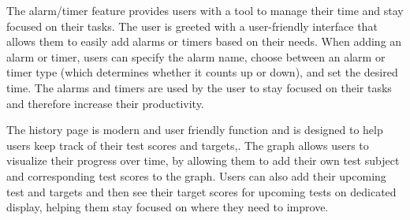 \documentclass[a4paper]{article}
\begin{document}
The alarm/timer feature provides users with a tool to manage their time and stay focused on their tasks. The user is greeted with a user-friendly interface that allows them to easily add alarms or timers based on their needs. When adding an alarm or timer, users can specify the alarm name, choose between an alarm or timer type (which determines whether it counts up or down), and set the desired time. The alarms and timers are used by the user to stay focused on their tasks and therefore increase their productivity.

The history page is modern and user friendly function and is designed to help users keep track of their test scores and targets,. The graph allows users to visualize their progress over time,  by allowing them to add their own test subject and corresponding test scores to the graph. Users can also add their upcoming test and targets and then see their target scores for upcoming tests on dedicated display, helping them stay focused on where they need to improve.
\end{document}
